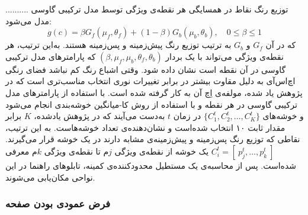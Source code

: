 \documentclass[oneside,openany,mscS]{SBU-Thesis}
\begin{document}
	..........
	توزیع رنگ نقاط در همسایگی هر نقطه‌ی ویژگی توسط مدل ترکیبی گاوسی مدل می‌شود:
	\begin{equation}
	g(c) = \beta G_f(\mu_f , \theta_f) + (1 - \beta)G_b(\mu_b , \theta_b), \quad 0 \le \beta \le 1
	\label{eq:GMM}
	\end{equation}
	که در آن $G_f$ و $G_b$ به ترتیب توزیع رنگ پیش‌زمینه و پس‌زمینه هستند. به‌این ترتیب، هر نقطه‌ی ویژگی می‌تواند با یک بردار 
	$(\beta , \mu_f , \mu_b , \theta_f , \theta_b)$
	که پارامترهای مدل ترکیبی گاوسی در آن نقطه‌ است نشان داده شود. وقتی اشباع رنگ کم نباشد فضای رنگی اچ‌اس‌آی به دلیل مقاوت بیشتر در برابر تغییرات نوری انتخاب مناسب‌تری است که در پژوهش‌ یاد شده، مولفه‌ی اِچ آن به کار گرفته شده‌ است. با استفاده از پارامترهای مدل ترکیبی گاوسی در هر نقطه و با استفاده از روش کا-میانگین خوشه‌بندی انجام می‌شود و خوشه‌های
	$\lbrace C_1^t , C_2^t , \dots , C_K^t \rbrace$
	در زمان $t$ به‌دست می‌آیند که در پژوهش یادشده، $K$ برابر مقدار ثابت ۱۰ انتخاب شده‌است و نشان‌دهنده‌ی تعداد خوشه‌هاست. به این ترتیب، نقاطی که توزیع رنگ پس‌زمینه و پیش‌زمینه‌ی مشابه دارند در یک خوشه قرار می‌گیرند. 
	$C_i^t = \left[ \ p_j^t , \dots , p_k^t \ \right] $
	یک خوشه از نقطه‌ی ویژگی $j$م تا نقطه‌ی ویژگی $k$م معرفی شده‌است. پس از محاسبه‌ی یک مستطیل محدود‌کننده‌ی کمینه، تابلوهای راهنما در این نواحی مکان‌یابی می‌شوند. 
	
	
	
	
	\subsubsection{فرض عمودی بودن صفحه}
	
\end{document}

